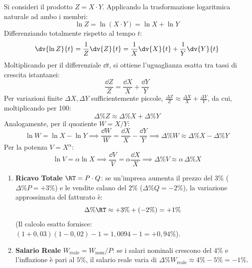 \begin{dimostrazione}
Si consideri il prodotto $Z = X \cdot Y$. Applicando la trasformazione logaritmica naturale ad ambo i membri:
\begin{equation}
    \ln Z = \ln(X \cdot Y) = \ln X + \ln Y
\end{equation}
Differenziando totalmente rispetto al tempo $t$:
\begin{equation}
    \dv{\ln Z}{t} = \frac{1}{Z} \dv{Z}{t} = \frac{1}{X} \dv{X}{t} + \frac{1}{Y} \dv{Y}{t}
\end{equation}
Moltiplicando per il differenziale $\dd t$, si ottiene l'uguaglianza esatta tra tassi di crescita istantanei:
\begin{equation}
    \frac{\dd Z}{Z} = \frac{\dd X}{X} + \frac{\dd Y}{Y}
\end{equation}
Per variazioni finite $\Delta X, \Delta Y$ sufficientemente piccole, $\frac{\Delta Z}{Z} \approx \frac{\Delta X}{X} + \frac{\Delta Y}{Y}$, da cui, moltiplicando per 100:
\begin{equation}
    \Delta\% Z \approx \Delta\% X + \Delta\% Y
\end{equation}
Analogamente, per il quoziente $W = X / Y$:
\begin{equation}
    \ln W = \ln X - \ln Y \implies \frac{\dd W}{W} = \frac{\dd X}{X} - \frac{\dd Y}{Y} \implies \Delta\% W \approx \Delta\% X - \Delta\% Y
\end{equation}
Per la potenza $V = X^\alpha$:
\begin{equation}
    \ln V = \alpha \ln X \implies \frac{\dd V}{V} = \alpha \frac{\dd X}{X} \implies \Delta\% V \approx \alpha \, \Delta\% X
\end{equation}
\end{dimostrazione}

\begin{esempio}
\begin{enumerate}
    \item \textbf{Ricavo Totale} $\RT = P \cdot Q$: se un'impresa aumenta il prezzo del $3\%$ ($\Delta\% P = +3\%$) e le vendite calano del $2\%$ ($\Delta\% Q = -2\%$), la variazione approssimata del fatturato è:
    \begin{equation}
        \Delta\% \RT \approx +3\% + (-2\%) = +1\%
    \end{equation}
    (Il calcolo esatto fornisce: $(1 + 0{,}03)(1 - 0{,}02) - 1 = 1{,}0094 - 1 = +0{,}94\%$).
    \item \textbf{Salario Reale} $W_{\text{reale}} = W_{\text{nom}} / P$: se i salari nominali crescono del $4\%$ e l'inflazione è pari al $5\%$, il salario reale varia di $\Delta\% W_{\text{reale}} \approx 4\% - 5\% = -1\%$.
\end{enumerate}
\end{esempio}

